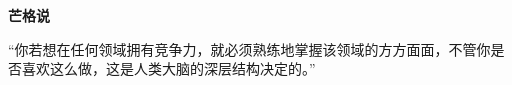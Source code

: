 \renewcommand{\bookchapter}{书单6}
\cleardoublepage
{}

\textbf{芒格说}
\par

\begin{MungerSaysBox}
{\kaishu “你若想在任何领域拥有竞争力，就必须熟练地掌握该领域的方方面面，不管你是否喜欢这么做，这是人类大脑的深层结构决定的。”}
\par
\end{MungerSaysBox}

\cleardoublepage








